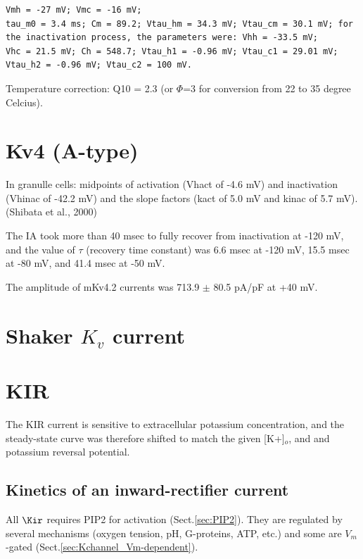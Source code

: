 \begin{verbatim}
Vmh = -27 mV; Vmc = -16 mV;
tau_m0 = 3.4 ms; Cm = 89.2; Vtau_hm = 34.3 mV; Vtau_cm = 30.1 mV; for
the inactivation process, the parameters were: Vhh = -33.5 mV;
Vhc = 21.5 mV; Ch = 548.7; Vtau_h1 = -0.96 mV; Vtau_c1 = 29.01 mV;
Vtau_h2 = -0.96 mV; Vtau_c2 = 100 mV.
\end{verbatim}
Temperature correction: Q10 = 2.3 (or $\Phi$=3 for conversion from 22 to 35
degree Celcius).


\section{Kv4 (A-type)}


In granulle cells: midpoints of activation (Vhact of -4.6 mV) and inactivation
(Vhinac of -42.2 mV) and the slope factors (kact of 5.0 mV and
kinac of 5.7 mV).  (Shibata et al., 2000)

The IA took more than 40 msec to fully recover from inactivation at -120 mV, and
the value of $\tau$ (recovery time constant) was 6.6 msec at -120 mV, 15.5 msec
at -80 mV, and 41.4 msec at -50 mV.

The amplitude of mKv4.2 currents was 713.9 $\pm$ 80.5 pA/pF at +40 mV.



\section{Shaker $K_v$ current}	


\citep{zagotta1994}


\section{KIR}
\label{sec:KIR-models}

The KIR current is sensitive to extracellular potassium concentration,
and the steady-state curve was therefore shifted to match the given [K+]$_o$,
and and potassium reversal potential.

\subsection{Kinetics of an inward-rectifier current}
\label{sec:Kir-channel-kinetics}

All $\Kir$ requires PIP2 for activation (Sect.\ref{sec:PIP2}).
They are regulated by several mechanisms (oxygen tension, pH, G-proteins, ATP,
etc.) and some are $V_m$-gated (Sect.\ref{sec:Kchannel_Vm-dependent}). 

